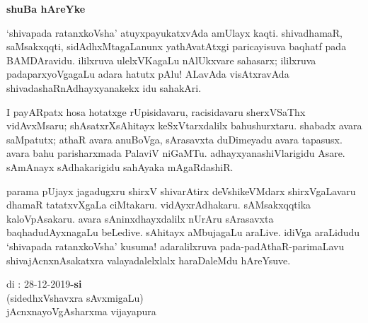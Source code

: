 \begin{center}
{\Huge\bfseries shuBa hAreYke}
\end{center}

\bigskip

`shivapada ratanxkoVsha' atuyxpayukatxvAda amUlayx kaqti. shivadhamaR, saMsakxqqti, sidAdhxMtagaLanunx yathAvatAtxgi paricayisuva baqhatf pada BAMDAravidu. ililxruva ulelxVKagaLu nAlUkxvare sahasarx; ililxruva padaparxyoVgagaLu adara hatutx pAlu! ALavAda visAtxravAda shivadashaRnAdhayxyanakekx idu sahakAri.

\medskip

I payARpatx hosa hotatxge rUpisidavaru, racisidavaru sherxVSaThx vidAvxMsaru; shAsatxrXsAhitayx keSxVtarxdalilx bahushurxtaru. shabadx avara saMpatutx; athaR avara anuBoVga, sArasavxta duDimeyadu avara tapasusx. avara bahu parisharxmada PalaviV niGaMTu. adhayxyana\-shiVlarigidu Asare. sAmAnayx sAdhakarigidu sahAyaka mAgaRdashiR.

\medskip

parama pUjayx jagadugxru shirxV shivarAtirx deVshikeVMdarx shirxVgaLavaru dhamaR tatatxvXgaLa ciMtakaru. vidAyxrAdhakaru. sAMsakxqqtika kaloVpAsakaru. avara sAninxdhayxdalilx nUrAru sArasavxta baqhadudAyxnagaLu beLedive. sAhitayx aMbujagaLu araLive. idiVga araLidudu `shivapada ratanxkoVsha' kusuma! adaralilxruva pada-padAthaR-parimaLavu shivajAcnxnAsakatxra valayadalelxlalx haraDaleMdu hAreYsuve.

\vskip 1.5cm

\noindent
di : 28-12-2019\hfill {\bf -si}\hspace{1.7cm}\,\\
\phantom{aa}\hfill (sidedhxVshavxra sAvxmigaLu)\quad\,\\
\phantom{a} \hfill jAcnxnayoVgAsharxma vijayapura
